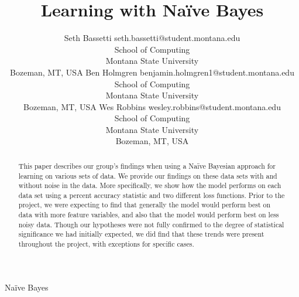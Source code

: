 \documentclass[twoside,11pt]{article}
\begin{document}
\title{Learning with Na{\"i}ve Bayes}

\author{\name Seth Bassetti \email seth.bassetti@student.montana.edu \\
       \addr School of Computing\\
       Montana State University\\
       Bozeman, MT, USA
	\AND
	\name Ben Holmgren \email benjamin.holmgren1@student.montana.edu \\
       \addr School of Computing\\
       Montana State University\\
       Bozeman, MT, USA
       \AND
       \name Wes Robbins \email wesley.robbins@student.montana.edu \\
       \addr School of Computing\\
       Montana State University\\
       Bozeman, MT, USA}

\maketitle

\begin{abstract}%
This paper describes our group's findings when using a Na{\"i}ve Bayesian
approach for learning on various sets of data. We provide our findings on
these data sets with and without noise in the data. More specifically, we show
how the model performs on each data set using a percent accuracy statistic
and two different loss functions. Prior to the project, we were expecting to find
that generally the model would perform best on data with more feature variables,
and also that the model would perform best on less noisy data. Though our
hypotheses were not fully confirmed to the degree of statistical significance
we had initially expected, we did find that these trends were present throughout
the project, with exceptions for specific cases.
\end{abstract}


\begin{keywords}
  Na{\"i}ve Bayes
\end{keywords}
\end{document}
